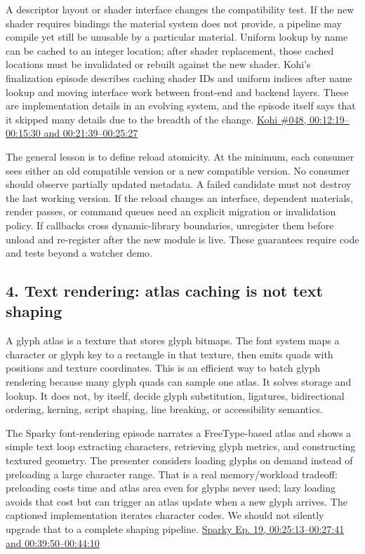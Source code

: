 A descriptor layout or shader interface changes the compatibility test. If the new shader requires bindings the material system does not provide, a pipeline may compile yet still be unusable by a particular material. Uniform lookup by name can be cached to an integer location; after shader replacement, those cached locations must be invalidated or rebuilt against the new shader. Kohi's finalization episode describes caching shader IDs and uniform indices after name lookup and moving interface work between front-end and backend layers. These are implementation details in an evolving system, and the episode itself says that it skipped many details due to the breadth of the change. \href{https://www.youtube.com/watch?v=9nP3aBsrCXs&t=12m19s}{Kohi \#048, 00:12:19--00:15:30 and 00:21:39--00:25:27}

The general lesson is to define reload atomicity. At the minimum, each consumer sees either an old compatible version or a new compatible version. No consumer should observe partially updated metadata. A failed candidate must not destroy the last working version. If the reload changes an interface, dependent materials, render passes, or command queues need an explicit migration or invalidation policy. If callbacks cross dynamic-library boundaries, unregister them before unload and re-register after the new module is live. These guarantees require code and tests beyond a watcher demo.

\subsection{4. Text rendering: atlas caching is not text shaping}\label{06-engine-ii-ch041-text-rendering-atlas-caching-is-not-text-shaping}

A glyph atlas is a texture that stores glyph bitmaps. The font system maps a character or glyph key to a rectangle in that texture, then emits quads with positions and texture coordinates. This is an efficient way to batch glyph rendering because many glyph quads can sample one atlas. It solves storage and lookup. It does not, by itself, decide glyph substitution, ligatures, bidirectional ordering, kerning, script shaping, line breaking, or accessibility semantics.

The Sparky font-rendering episode narrates a FreeType-based atlas and shows a simple text loop extracting characters, retrieving glyph metrics, and constructing textured geometry. The presenter considers loading glyphs on demand instead of preloading a large character range. That is a real memory/workload tradeoff: preloading costs time and atlas area even for glyphs never used; lazy loading avoids that cost but can trigger an atlas update when a new glyph arrives. The captioned implementation iterates character codes. We should not silently upgrade that to a complete shaping pipeline. \href{https://www.youtube.com/watch?v=Rsdc6I80aFQ&t=25m13s}{Sparky Ep. 19, 00:25:13--00:27:41 and 00:39:50--00:44:10}

